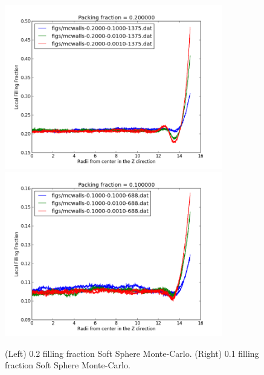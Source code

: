 \documentclass[a4paper,12pt]{article}
\begin{document}
\begin{landscape}
  \newpage
  \begin{figure}
    \centering
    \includegraphics[width=3.75in]{full_20.png}
    \includegraphics[width=3.75in]{full_10.png}
    \caption{(Left) 0.2 filling fraction Soft Sphere Monte-Carlo.  (Right) 0.1 filling fraction Soft Sphere Monte-Carlo.}
  \end{figure}
\end{landscape}
\end{document}
